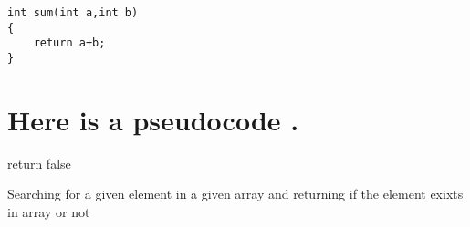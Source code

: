 \documentclass{article}
\begin{document}
\begin{lstlisting}
int sum(int a,int b)
{
	return a+b;
}
\end{lstlisting}


\section*{Here is a pseudocode .}


\begin{algorithm}[H]
return false\;
\caption{Searching for a given element in a given array and returning if the element exixts in array or not}
\end{algorithm}
\end{document}
